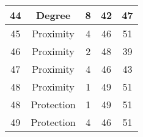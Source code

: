 \documentclass[results.tex]{subfiles}
\begin{document}
\begin{center}
\begin{tabular}{| c || c | c | c | c |}
    \hline
    44 & Degree & 8 & 42 & 47 \\ 
    \hline
    45 & Proximity & 4 & 46 & 51 \\ 
    \hline
    46 & Proximity & 2 & 48 & 39 \\ 
    \hline
    47 & Proximity & 4 & 46 & 43 \\ 
    \hline
    48 & Proximity & 1 & 49 & 51 \\ 
    \hline
    48 & Protection & 1 & 49 & 51 \\ 
    \hline
    49 & Protection & 4 & 46 & 51 \\ 
    \hline   \end{tabular}
\end{center}
\end{document}
